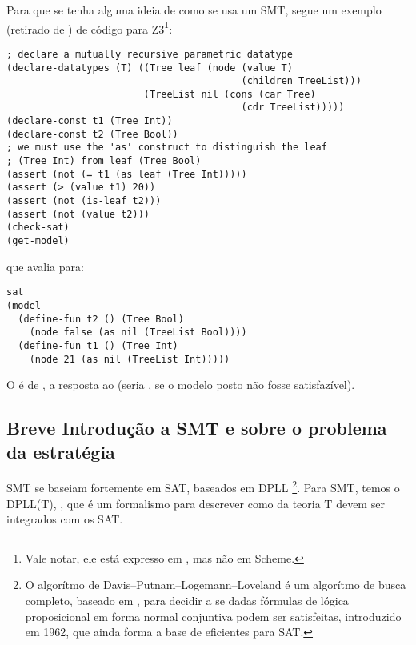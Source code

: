 Para que se tenha alguma ideia de como se usa um  SMT,
segue um exemplo (retirado de \cite{tuto}) de código para
Z3\footnote{Vale notar, ele está expresso em , mas
  não em Scheme.}:

\begin{lstlisting}
; declare a mutually recursive parametric datatype
(declare-datatypes (T) ((Tree leaf (node (value T)
                                         (children TreeList)))
                        (TreeList nil (cons (car Tree)
                                         (cdr TreeList)))))
(declare-const t1 (Tree Int))
(declare-const t2 (Tree Bool))
; we must use the 'as' construct to distinguish the leaf
; (Tree Int) from leaf (Tree Bool)
(assert (not (= t1 (as leaf (Tree Int)))))
(assert (> (value t1) 20))
(assert (not (is-leaf t2)))
(assert (not (value t2)))
(check-sat)
(get-model)
\end{lstlisting}

\noindent que avalia para:

\begin{lstlisting}
sat
(model
  (define-fun t2 () (Tree Bool)
    (node false (as nil (TreeList Bool))))
  (define-fun t1 () (Tree Int)
    (node 21 (as nil (TreeList Int)))))
\end{lstlisting}

O  é de , a resposta ao
 (seria , se o modelo posto não
fosse satisfazível).

\subsection{Breve Introdução a SMT e sobre o problema da estratégia}

 SMT se baseiam fortemente em  SAT,
baseados em DPLL \footnote{O algorítmo de
  Davis–Putnam–Logemann–Loveland é um algorítmo de busca completo,
  baseado em , para decidir a se dadas fórmulas
  de lógica proposicional em forma normal conjuntiva podem ser
  satisfeitas, introduzido em 1962, que ainda forma a base de
   eficientes para SAT.}. Para SMT, temos o DPLL(T),
, que é um formalismo para descrever como  da teoria
T devem ser integrados com os  SAT.

